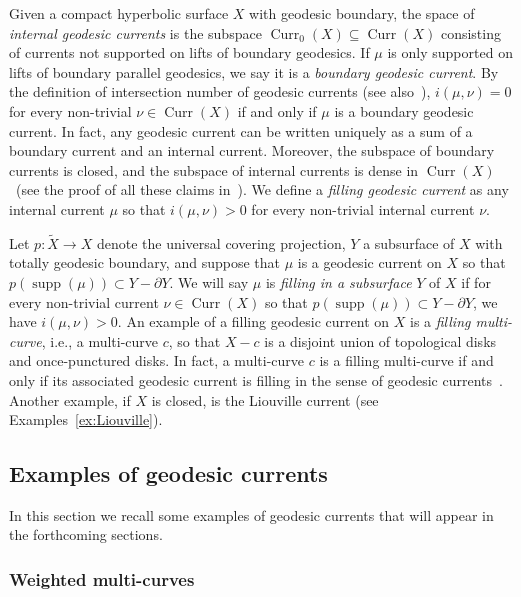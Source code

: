 \documentclass[12pt,article]{amsart}
\numberwithin{equation}{section}
\numberwithin{figure}{section}
\theoremstyle{definition}
\theoremstyle{plain}
\DeclareMathOperator{\Curr}{Curr}
\newcommand*{\wt}[1]{\widetilde{#1}}
\DeclareMathOperator{\supp}{supp}
\begin{document}
Given a compact hyperbolic surface $X$ with geodesic boundary, the space of \emph{internal geodesic currents} is the subspace $\Curr_0(X) \subseteq \Curr(X)$ consisting of currents not supported on lifts of boundary geodesics.
If $\mu$ is only supported on lifts of boundary parallel geodesics, we say it is a \emph{boundary geodesic current}.
By the definition of intersection number of geodesic currents (see also~\cite[Exercise~3.11]{ES22:GeodesicCount}), $i(\mu, \nu)=0$ for every non-trivial $\nu \in \Curr(X)$ if and only if $\mu$ is a boundary geodesic current.
In fact, any geodesic current can be written uniquely as a sum of a boundary current and an internal current. Moreover, the subspace of boundary currents is closed, and the subspace of internal currents is dense in $\Curr(X)$~(see the proof of all these claims in~\cite[Lemma~2.12]{EM18:ErgodicGeodesicCurrents}).
We define a \emph{filling geodesic current} as any internal current $\mu$ so that $i(\mu,\nu)>0$ for every non-trivial internal current $\nu$.

Let $p \colon \wt{X} \to X$ denote the universal covering projection, $Y$ a subsurface of $X$ with totally geodesic boundary, and suppose that $\mu$ is a geodesic current on $X$ so that $p(\supp(\mu)) \subset Y-\partial Y$. We will say $\mu$ is \emph{filling in a subsurface} $Y$ of $X$ if for every non-trivial current $\nu \in \Curr(X)$ so that $p(\supp(\mu)) \subset Y-\partial Y$, we have $i(\mu,\nu)>0$.
An example of a filling geodesic current on $X$ is a \emph{filling multi-curve}, i.e., a multi-curve $c$, so that $X-c$ is a disjoint union of topological disks and once-punctured disks.
In fact, a multi-curve $c$ is a filling multi-curve if and only if its associated geodesic current is filling in the sense of geodesic currents~\cite[Exercise~3.13]{ES22:GeodesicCount}.
Another example, if $X$ is closed, is the Liouville current (see Examples~\ref{ex:Liouville}). 


\subsection{Examples of geodesic currents}
\label{subsec:examples_currents}

In this section we recall some examples of geodesic currents that will appear in the forthcoming sections.

\subsubsection{Weighted multi-curves}
\end{document}
